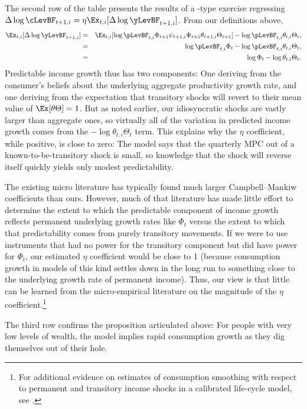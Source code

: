 \documentclass[titlepage]{\econtex}\newcommand{\texname}{cAndCwithStickyE}
\begin{document}
The second row of the table presents the results of a \cite{cmModel}-type exercise regressing $\Delta \log \cLevBF_{t+1,i} = \eta \Ex_{t,i}[\Delta \log \yLevBF_{t+1,i}]$.  From our definitions above,
\begin{eqnarray*}
  \Ex_{t,i}[\Delta \log \yLevBF_{t+1,i}] & = & \Ex_{t,i}[\log \pLevBF_{t,i}\Phi_{t+1}\psi_{t+1,i}\Psi_{t+1}\theta_{t+1,i}\Theta_{t+1}] - \log \pLevBF_{t,i}\theta_{t,i}\Theta_{t},
  \\ & = & \log \pLevBF_{t,i}\Phi_{t} - \log \pLevBF_{t,i}\theta_{t,i}\Theta_{t},
   \\ & = & \log \Phi_{t} - \log \theta_{t,i}\Theta_{t}.
\end{eqnarray*}
Predictable income growth thus has two components: One deriving from the consumer's beliefs about the underlying aggregate productivity growth rate, and one deriving from the expectation that transitory shocks will revert to their mean value of $\Ex[\theta \Theta]=1$.  But as noted earlier, our idiosyncratic shocks are vastly larger than aggregate ones, so virtually all of the variation in predicted income growth comes from the $-\log \theta_{t,i}\Theta_{t}$ term.  This explains why the $\eta$ coefficient, while positive, is close to zero: The model says that the quarterly MPC out of a known-to-be-transitory shock is small, so knowledge that the shock will reverse itself quickly yields only modest predictability.

The existing micro literature has typically found much larger Campbell--Mankiw coefficients than ours.  However, much of that literature has made little effort to determine the extent to which the predictable component of income growth reflects permanent underlying growth rates like $\Phi_{t}$ versus the extent to which that predictability comes from purely transitory movements.  If we were to use instruments that had no power for the transitory component but did have power for $\Phi_{t}$, our estimated $\eta$ coefficient would be close to 1 (because consumption growth in models of this kind settles down in the long run to something close to the underlying growth rate of permanent income).  Thus, our view is that little can be learned from the micro-empirical literature on the magnitude of the $\eta$ coefficient.\footnote{For additional evidence on estimates of consumption smoothing with respect to permanent and transitory income shocks in a calibrated life-cycle model, see \cite{kaplanViolante:aejMacro}.}

The third row confirms the proposition articulated above: For people with very low levels of wealth, the model implies rapid consumption growth as they dig themselves out of their hole.
\end{document}
